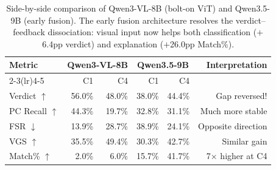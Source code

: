\documentclass{article}
\begin{document}
\begin{table}[h]
\centering
\small
\begin{tabular}{@{}lrrrrr@{}}
\toprule
Metric & \multicolumn{2}{c}{Qwen3-VL-8B} & \multicolumn{2}{c}{Qwen3.5-9B} & Interpretation \\
\cmidrule(lr){2-3}\cmidrule(lr){4-5}
 & C1 & C4 & C1 & C4 & \\
\midrule
Verdict $\uparrow$   & 56.0\% & 48.0\% & 38.0\% & 44.4\% & Gap reversed! \\
PC Recall $\uparrow$ & 44.3\% & 19.7\% & 32.8\% & 31.1\% & Much more stable \\
FSR $\downarrow$     & 13.9\% & 28.7\% & 38.9\% & 24.1\% & Opposite direction \\
VGS $\uparrow$       & 35.5\% & 49.4\% & 30.3\% & 42.7\% & Similar gain \\
Match\% $\uparrow$   &  2.0\% &  6.0\% & 15.7\% & 41.7\% & 7$\times$ higher at C4 \\
\bottomrule
\end{tabular}
\caption{Side-by-side comparison of Qwen3-VL-8B (bolt-on ViT) and Qwen3.5-9B
(early fusion). The early fusion architecture resolves the verdict--feedback
dissociation: visual input now helps both classification ($+$6.4pp verdict)
and explanation ($+$26.0pp Match\%).}
\label{tab:arch_comparison}
\end{table}
\end{document}
